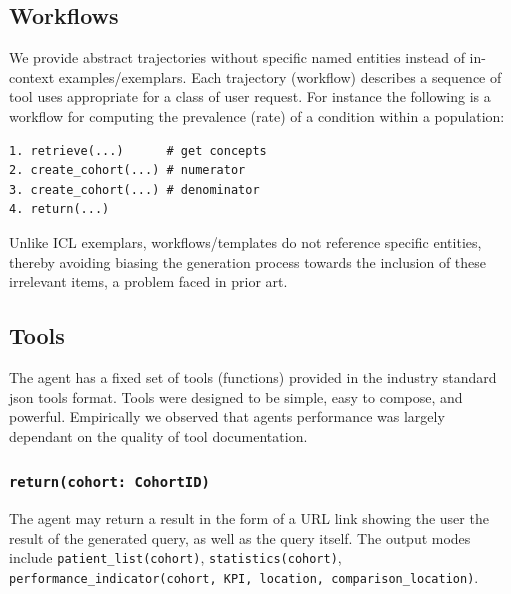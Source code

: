 \documentclass[11pt]{article}
\begin{document}
\subsection{Workflows}

We provide abstract trajectories without specific named entities instead of in-context examples/exemplars.
Each trajectory (workflow) describes a sequence of tool uses appropriate for a class of user request.
For instance the following is a workflow for computing the prevalence (rate) of a condition within a population:
\begin{verbatim}
1. retrieve(...)      # get concepts
2. create_cohort(...) # numerator
3. create_cohort(...) # denominator
4. return(...)
\end{verbatim}

Unlike ICL exemplars, workflows/templates do not reference specific entities, thereby avoiding biasing the generation process towards the inclusion of these irrelevant items, a problem faced in prior art.

\subsection{Tools}
The agent has a fixed set of tools (functions) provided in the industry standard json tools format.
Tools were designed to be simple, easy to compose, and powerful.
Empirically we observed that agents performance was largely dependant on the quality of tool documentation.

\subsubsection*{\texttt{return(cohort: CohortID)}}
The agent may return a result in the form of a URL link showing the user the result of the generated query, as well as the query itself.
The output modes include \texttt{patient\_list(cohort)}, \texttt{statistics(cohort)}, \texttt{performance\_indicator(cohort, KPI, location, comparison\_location)}.
\end{document}
